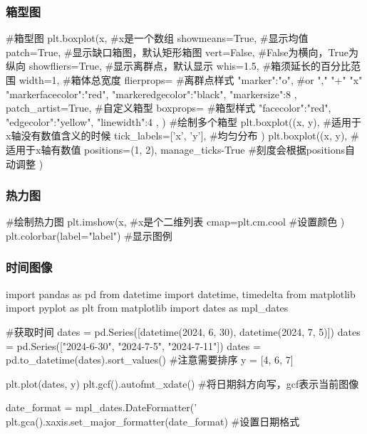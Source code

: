     \subsubsection{箱型图}
      \begin{codeblock}[language=python, caption={box plot}]
        #箱型图
        plt.boxplot(x, #x是一个数组
                    showmeans=True, #显示均值
                    patch=True, #显示缺口箱图，默认矩形箱图
                    vert=False, #False为横向，True为纵向
                    showfliers=True, #显示离群点，默认显示
                    whis=1.5, #箱须延长的百分比范围
                    width=1, #箱体总宽度
                    flierprops={ #离群点样式
                        "marker":"o", #or "," "+" "x"
                        "markerfacecolor":"red",
                        "markeredgecolor":"black",
                        "markersize":8
                    }, 
                    patch_artist=True, #自定义箱型
                    boxprops={ #箱型样式
                        "facecolor":"red",
                        "edgecolor":"yellow",
                        "linewidth":4
                    },
        ) 
        #绘制多个箱型
        plt.boxplot((x, y), #适用于x轴没有数值含义的时候
                    tick_labels=['x', 'y'], #均匀分布
        )
        plt.boxplot((x, y), #适用于x轴有数值
                    positions=(1, 2), 
                    manage_ticks-True #刻度会根据positions自动调整
        )
      \end{codeblock}

    \subsubsection{热力图}
      \begin{codeblock}[language=python, caption={heat map}]
        #绘制热力图
        plt.imshow(x, #x是个二维列表
                  cmap=plt.cm.cool #设置颜色
        ) 
        plt.colorbar(label="label") #显示图例
      \end{codeblock}
    
    \subsubsection{时间图像}
      \begin{codeblock}[language=python, caption={Plotting Time Series Data}]
        import pandas as pd
        from datetime import datetime, timedelta
        from matplotlib import pyplot as plt
        from matplotlib import dates as mpl_dates

        #获取时间
        dates = pd.Series([datetime(2024, 6, 30), datetime(2024, 7, 5)])
        dates = pd.Series(["2024-6-30", "2024-7-5", "2024-7-11"])
        dates = pd.to_datetime(dates).sort_values() #注意需要排序
        y = [4, 6, 7]

        plt.plot(dates, y)
        plt.gcf().autofmt_xdate() #将日期斜方向写，gcf表示当前图像

        date_format = mpl_dates.DateFormatter('%
        plt.gca().xaxis.set_major_formatter(date_format) #设置日期格式
      \end{codeblock}

